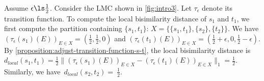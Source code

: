 \documentclass[a4paper,UKenglish,cleveref,autoref,thm-restate]{lipics-v2021}
\newcommand{\local}{\mathit{local}}
\newcommand{\tauHyp}{\tau_{\epsilon}}
\begin{document}
\begin{example}\label{example:intro3}
 Assume $\epsilon \ls \frac{1}{2}$. Consider the LMC shown in \cref{fig:intro3}. Let $\tauHyp$ denote its transition function. To compute the local bisimilarity distance of $s_1$ and $t_1$, we first compute the partition containing $\{s_1, t_1\}$: $X = \big\{ \{ s_1, t_1\}, \{ s_2\},\{ t_2\} \big\}$. We have $(\tauHyp(s_1)(E))_{E \in X} = (\frac{1}{2}, \frac{1}{2}, 0)$ and $(\tauHyp(t_1)(E))_{E \in X} = (\frac{1}{2}+\epsilon, 0, \frac{1}{2}-\epsilon)$. By \cref{proposition:adjust-transition-function-s-t}, the local bisimilarity distance is $d_{\local}(s_1, t_1) = \frac{1}{2}\|(\tauHyp(s_1)(E))_{E \in X} -(\tauHyp(t_1)(E))_{E \in X}\|_1 = \frac{1}{2}$. Similarly, we have~$d_{\local}(s_2, t_2) =~\frac{1}{2}$.%
\end{example}
\end{document}
